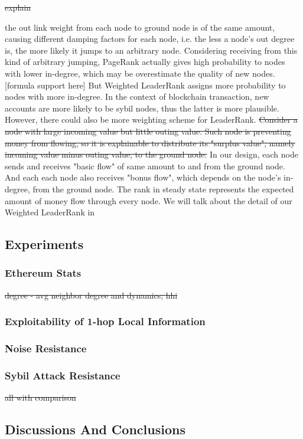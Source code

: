 \st{explain}

 the out link weight from each node to ground node is of the same amount, causing different damping factors for each node, i.e. the less a node's out degree is, the more likely it jumps to an arbitrary node. Considering receiving from this kind of arbitrary jumping, PageRank actually gives high probability to nodes with lower in-degree, which may be overestimate the quality of new nodes.[formula support here] But Weighted LeaderRank\cite{Li2014} assigns more probability to nodes with more in-degree. In the context of blockchain transaction, new accounts are more likely to be sybil nodes, thus the latter is more plausible. However, there could also be more weighting scheme for LeaderRank. \st{Consider a node with large incoming value but little outing value. Such node is preventing money from flowing, so it is explainable to distribute its "surplus value", namely incoming value minus outing value, to the ground node.} In our design, each node sends and receives "basic flow" of same amount to and from the ground node. And each each node also receives "bonus flow", which depends on the node's in-degree, from the ground node. The rank in steady state represents the expected amount of money flow through every node. We will talk about the detail of our Weighted LeaderRank in 



\subsection{Experiments} \label{sec:exp}
\subsubsection{Ethereum Stats}
\st{degree - avg neighbor degree and dynamics; hhi}
\subsubsection{Exploitability of 1-hop Local Information}
\subsubsection{Noise Resistance}
\subsubsection{Sybil Attack Resistance}
\st{all with comparison}

\subsection{Discussions And Conclusions} \label{sec:discuss}
